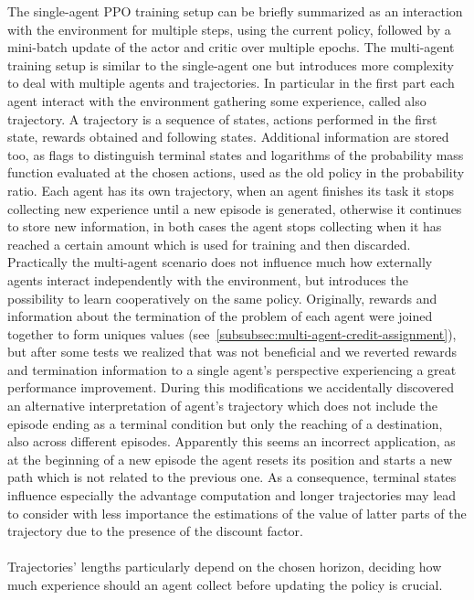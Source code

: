 \documentclass[11pt, a4paper, hidelinks]{report}
\begin{document}
The single-agent PPO training setup can be briefly summarized as an interaction with the environment for multiple steps, using the current policy, followed by a mini-batch update of the actor and critic over multiple epochs.
The multi-agent training setup is similar to the single-agent one but introduces more complexity to deal with multiple agents and trajectories.
In particular in the first part each agent interact with the environment gathering some experience, called also trajectory.
A trajectory is a sequence of states, actions performed in the first state, rewards obtained and following states.
Additional information are stored too, as flags to distinguish terminal states and logarithms of the probability mass function evaluated at the chosen actions, used as the old policy in the probability ratio.
Each agent has its own trajectory, when an agent finishes its task it stops collecting new experience until a new episode is generated, otherwise it continues to store new information, in both cases the agent stops collecting when it has reached a certain amount which is used for training and then discarded.
Practically the multi-agent scenario does not influence much how externally agents interact independently with the environment, but introduces the possibility to learn cooperatively on the same policy.
Originally, rewards and information about the termination of the problem of each agent were joined together to form uniques values (see~\ref{subsubsec:multi-agent-credit-assignment}), but after some tests we realized that was not beneficial and we reverted rewards and termination information to a single agent's perspective experiencing a great performance improvement.
During this modifications we accidentally discovered an alternative interpretation of agent's trajectory which does not include the episode ending as a terminal condition but only the reaching of a destination, also across different episodes.
Apparently this seems an incorrect application, as at the beginning of a new episode the agent resets its position and starts a new path which is not related to the previous one.
As a consequence, terminal states influence especially the advantage computation and longer trajectories may lead to consider with less importance the estimations of the value of latter parts of the trajectory due to the presence of the discount factor.%
\\
\\
Trajectories' lengths particularly depend on the chosen horizon, deciding how much experience should an agent collect before updating the policy is crucial.
\end{document}
